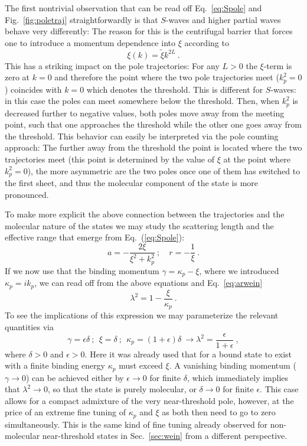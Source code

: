 The first nontrivial observation that can be read off Eq.~\eqref{eq:Spole} and
Fig.~\ref{fig:poletraj} straightforwardly is that $S$-waves and higher partial
waves behave very differently: The reason for this is the centrifugal barrier
that forces one to introduce a momentum dependence into $\xi$ according to
\begin{equation}
\xi(k) = \tilde \xi k^{2L} \ .
\end{equation}
This has a striking impact on the pole trajectories: For any $L>0$ the 
$\xi$-term is zero at $k=0$ and therefore
the point where the two pole trajectories  meet ($k_p^2=0$) coincides with 
$k=0$ which denotes the threshold. This is different for $S$-waves:
in this case the poles can meet somewhere below the threshold. Then, when 
$k_p^2$ is decreased further to negative 
values, both poles move away from the meeting point, such that one approaches 
the threshold while the other one goes away
from the threshold. This behavior can easily be interpreted via the pole 
counting approach: The further
away from the threshold the point is located where the two trajectories meet 
(this point is determined by the value of 
$\xi$ at the point where $k_p^2=0$), the more asymmetric are the two poles once 
one of them has switched to the first sheet, and thus the  molecular component of
 the state is more pronounced.

To make more explicit the above connection between the trajectories and the
molecular nature of the states we may study the scattering length and the
effective range that emerge from Eq.~(\ref{eq:Spole}):
\begin{equation}
a=-\frac{2\xi}{\xi^2+k_p^2} \ ; \quad r=-\frac{1}{\xi} \ .
\end{equation}
If we now use that the binding momentum $\gamma = \kappa_p-\xi$, where we 
introduced $\kappa_p=i k_p$, we can read off from the above equations and
Eq.~\eqref{eq:arwein}
\begin{equation}
\lambda^2 = 1-\frac{\xi}{\kappa_p} \ .
\end{equation}
To see the implications of this expression we may parameterize the relevant
quantities via
\begin{equation}
\gamma = \epsilon \delta \ ; \ \ \xi = \delta \ ; \ \ \kappa_p=(1+\epsilon)\delta \ \longrightarrow \lambda^2=\frac{\epsilon}{1+\epsilon} \ ,
\end{equation}
where $\delta>0$ and $\epsilon>0$.
Here it was already used that for a bound state to exist with a finite
binding energy $\kappa_p$ must exceed $\xi$. A vanishing binding momentum
($\gamma\to 0$) can be achieved either by $\epsilon\to 0$ for finite $\delta$, 
which immediately implies that $\lambda^2\to 0$, so that the state is purely
molecular, or $\delta\to 0$ for finite $\epsilon$. This case allows for a 
compact admixture of the very near-threshold pole, however, at the price of an 
extreme fine tuning of $\kappa_p$ and $\xi$ as both then need to go to zero 
simultaneously. This is the same kind of fine tuning already observed for 
non-molecular near-threshold states in Sec.~\ref{sec:wein} from a different
perspective.

